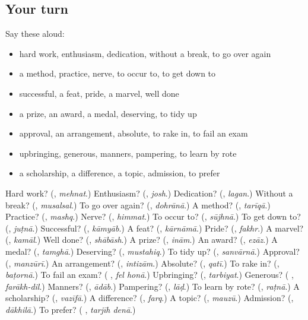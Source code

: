 \subsection*{Your turn}
Say these aloud:

\begin{itemize}
\raggedright
  \item hard work, enthusiasm, dedication, without a break, to go over again
  \item a method, practice, nerve, to occur to, to get down to
  \item successful, a feat, pride, a marvel, well done
  \item a prize, an award, a medal, deserving, to tidy up
  \item approval, an arrangement, absolute, to rake in, to fail an exam
  \item upbringing, generous, manners, pampering, to learn by rote
  \item a scholarship, a difference, a topic, admission, to prefer
\end{itemize}

\begin{tcolorbox}[breakable,colback=teal!4,colframe=teal!35!black,title={Before you move on}]
Hard work? (\textbf{}, \emph{mehnat}.) Enthusiasm? (\textbf{}, \emph{josh}.) Dedication? (\textbf{}, \emph{lagan}.) Without a break? (\textbf{}, \emph{musalsal}.) To go over again? (\textbf{}, \emph{dohrānā}.) A method? (\textbf{}, \emph{tarīqā}.) Practice? (\textbf{}, \emph{mashq}.) Nerve? (\textbf{}, \emph{himmat}.) To occur to? (\textbf{}, \emph{sūjhnā}.) To get down to? (\textbf{}, \emph{juṭnā}.) Successful? (\textbf{}, \emph{kāmyāb}.) A feat? (\textbf{}, \emph{kārnāmā}.) Pride? (\textbf{}, \emph{fakhr}.) A marvel? (\textbf{}, \emph{kamāl}.) Well done? (\textbf{}, \emph{shābāsh}.) A prize? (\textbf{}, \emph{inām}.) An award? (\textbf{}, \emph{ezāz}.) A medal? (\textbf{}, \emph{tamghā}.) Deserving? (\textbf{}, \emph{mustahiq}.) To tidy up? (\textbf{}, \emph{sanvārnā}.) Approval? (\textbf{}, \emph{manzūrī}.) An arrangement? (\textbf{}, \emph{intizām}.) Absolute? (\textbf{}, \emph{qatī}.) To rake in? (\textbf{}, \emph{baṭornā}.) To fail an exam? (\textbf{ }, \emph{fel honā}.) Upbringing? (\textbf{}, \emph{tarbiyat}.) Generous? (\textbf{ }, \emph{farākh-dil}.) Manners? (\textbf{}, \emph{ādāb}.) Pampering? (\textbf{}, \emph{lāḍ}.) To learn by rote? (\textbf{}, \emph{raṭnā}.) A scholarship? (\textbf{}, \emph{vazīfā}.) A difference? (\textbf{}, \emph{farq}.) A topic? (\textbf{}, \emph{mauzū}.) Admission? (\textbf{}, \emph{dākhilā}.) To prefer? (\textbf{ }, \emph{tarjīh denā}.)
\end{tcolorbox}
